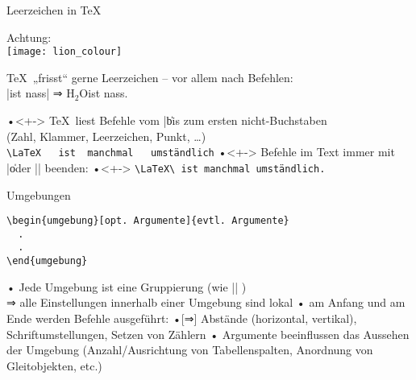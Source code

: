 \begin{frame}[fragile]{Leerzeichen in \TeX}
\parbox{.12\textwidth}{\alert{Achtung:}\\ \texttt{[image: lion\_colour]}}
\TeX\ „frisst“ gerne Leerzeichen – vor allem nach Befehlen:\\
|\wasser ist nass| ⇒ H$_2$Oist nass.

\pause
•<+-> \TeX\ liest Befehle vom |\| bis zum ersten nicht-Buchstaben%
\\ (Zahl, Klammer, Leerzeichen, Punkt, \dots)
\\ \verb*|\LaTeX   ist  manchmal   umständlich|%
•<+-> Befehle im Text immer mit |\| oder |{}| beenden:
•<+-> \verb*|\LaTeX\ ist manchmal umständlich.|
\•
\begin{block}{}\centerline{
}
\end{block}
\end{frame}



\begin{frame}[fragile]{Umgebungen}
\begin{lstlisting}
\begin{umgebung}[opt. Argumente]{evtl. Argumente}
  .
  .
\end{umgebung}
\end{lstlisting}
\pause 
• Jede Umgebung ist eine Gruppierung (wie |{}| )\\
 ⇒ alle Einstellungen innerhalb einer Umgebung sind lokal%
• am Anfang und am Ende werden Befehle ausgeführt:
•[⇒] Abstände (horizontal, vertikal), Schriftumstellungen, Setzen von Zählern
• Argumente beeinflussen das Aussehen der Umgebung (Anzahl/Ausrichtung von Tabellenspalten, Anordnung von Gleitobjekten, etc.)
\•
\end{frame}

